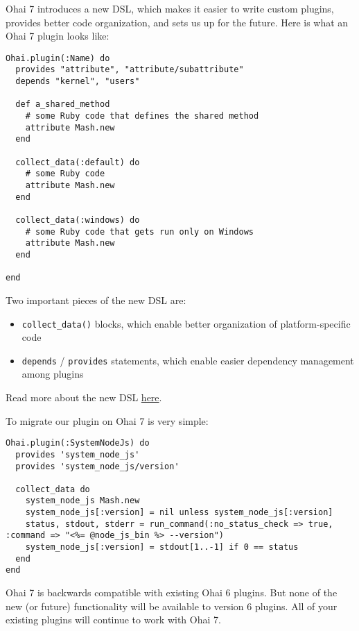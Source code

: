 Ohai 7 introduces a new DSL, which makes it easier to write custom plugins, provides better code organization, and sets us up for the future. Here is what an Ohai 7 plugin looks like:

\begin{lstlisting}[label=lst:cookbook-ohai9]
Ohai.plugin(:Name) do
  provides "attribute", "attribute/subattribute"
  depends "kernel", "users"

  def a_shared_method
    # some Ruby code that defines the shared method
    attribute Mash.new
  end

  collect_data(:default) do
    # some Ruby code
    attribute Mash.new
  end

  collect_data(:windows) do
    # some Ruby code that gets run only on Windows
    attribute Mash.new
  end

end
\end{lstlisting}

Two important pieces of the new DSL are:

\begin{itemize}
  \item \lstinline!collect_data()! blocks, which enable better organization of platform-specific code
  \item \lstinline!depends! / \lstinline!provides! statements, which enable easier dependency management among plugins
\end{itemize}

Read more about the new DSL \href{http://docs.opscode.com/ohai_custom.html}{here}.

To migrate our plugin on Ohai 7 is very simple:

\begin{lstlisting}[label=lst:cookbook-ohai10,title=my-server-cloud/site-cookbooks/my\_cool\_app/templates/default/plugin/system\_node\_js.rb.erb]
Ohai.plugin(:SystemNodeJs) do
  provides 'system_node_js'
  provides 'system_node_js/version'

  collect_data do
    system_node_js Mash.new
    system_node_js[:version] = nil unless system_node_js[:version]
    status, stdout, stderr = run_command(:no_status_check => true, :command => "<%= @node_js_bin %> --version")
    system_node_js[:version] = stdout[1..-1] if 0 == status
  end
end
\end{lstlisting}

Ohai 7 is backwards compatible with existing Ohai 6 plugins. But none of the new (or future) functionality will be available to version 6 plugins. All of your existing plugins will continue to work with Ohai 7.